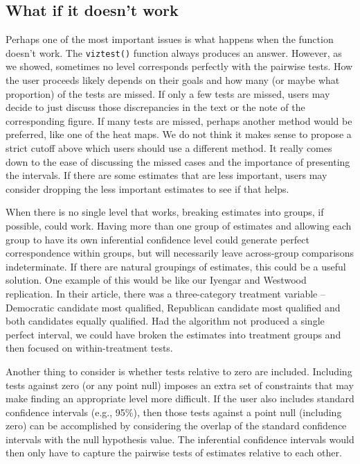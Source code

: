 \subsection{What if it doesn't work}\label{what-if-it-doesnt-work}

Perhaps one of the most important issues is what happens when the function doesn't work. The \texttt{viztest()} function always produces an answer. However, as we showed, sometimes no level corresponds perfectly with the pairwise tests. How the user proceeds likely depends on their goals and how many (or maybe what proportion) of the tests are missed. If only a few tests are missed, users may decide to just discuss those discrepancies in the text or the note of the corresponding figure. If many tests are missed, perhaps another method would be preferred, like one of the heat maps. We do not think it makes sense to propose a strict cutoff above which users should use a different method. It really comes down to the ease of discussing the missed cases and the importance of presenting the intervals. If there are some estimates that are less important, users may consider dropping the less important estimates to see if that helps.

When there is no single level that works, breaking estimates into groups, if possible, could work. Having more than one group of estimates and allowing each group to have its own inferential confidence level could generate perfect correspondence within groups, but will necessarily leave across-group comparisons indeterminate. If there are natural groupings of estimates, this could be a useful solution. One example of this would be like our Iyengar and Westwood replication. In their article, there was a three-category treatment variable -- Democratic candidate most qualified, Republican candidate most qualified and both candidates equally qualified. Had the algorithm not produced a single perfect interval, we could have broken the estimates into treatment groups and then focused on within-treatment tests.

Another thing to consider is whether tests relative to zero are included. Including tests against zero (or any point null) imposes an extra set of constraints that may make finding an appropriate level more difficult. If the user also includes standard confidence intervals (e.g., 95\%), then those tests against a point null (including zero) can be accomplished by considering the overlap of the standard confidence intervals with the null hypothesis value. The inferential confidence intervals would then only have to capture the pairwise tests of estimates relative to each other.

